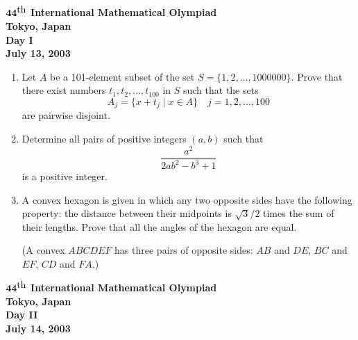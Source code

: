 \documentclass[12pt]{article}
\def\th{^{\scriptstyle\mbox{th}}}
\begin{document}
\begin{center}
${\bf 44\th}$ {\bf International Mathematical Olympiad} \\[.1in]
{\bf Tokyo, Japan} \\ [.05in]
{\bf Day I%
}\\[.05in]
{\bf July 13, 2003}
\end{center}

\vspace*{.3in}

\begin{enumerate}
\item %
Let $A$ be a 101-element subset of the set $S = \{1, 2, \dots,
1000000\}$. Prove that there exist numbers $t_1, t_2, \dots, t_{100}$
in $S$ such that the sets
\[
A_j = \{ x + t_j \mid x \in A\} \quad j=1, 2,\dots, 100
\]
are pairwise disjoint.

\item %
Determine all pairs of positive integers $(a,b)$ such that 
\[
\frac{a^2}{2ab^2-b^3+1}
\]
is a positive integer.

\item %
A convex hexagon is given in which any two opposite sides have the following property: the distance between their midpoints is 
$\sqrt{3}/2$ times the sum of their lengths. Prove that all the angles of the hexagon are equal.

(A convex $ABCDEF$ has three pairs of opposite sides: $AB$ and $DE$, $BC$ and $EF$, $CD$ and $FA$.)

\end{enumerate}

\pagebreak %
\begin{center}
${\bf 44\th}$ {\bf International Mathematical Olympiad} \\[.1in]
{\bf Tokyo, Japan} \\ [.05in]
{\bf Day II%
}\\[.05in]
{\bf July 14, 2003}
\end{center}

\vspace*{.3in}
\end{document}
